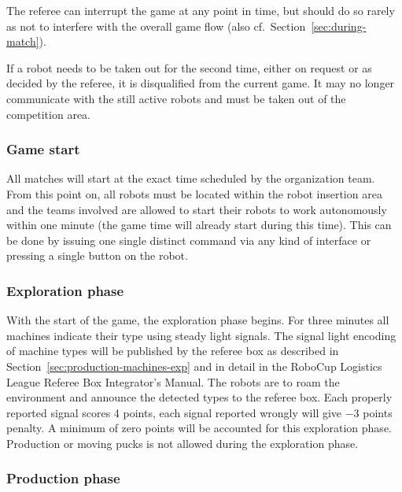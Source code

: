 \documentclass[12pt,twoside]{article}
\newcommand{\refsec}[1]{Section~\ref{#1}}
\begin{document}
The referee can interrupt the game at any point in time, but should do
so rarely as not to interfere with the overall game flow (also
cf.~\refsec{sec:during-match}).

If a robot needs to be taken out for the second time, either on
request or as decided by the referee, it is disqualified from the
current game. It may no longer communicate with the still active
robots and must be taken out of the competition area.

\subsubsection{Game start}
\label{sec:game-start}
%
All matches will start at the exact time scheduled by the organization
team. From this point on, all robots must be located within the robot
insertion area and the teams involved are allowed to start their
robots to work autonomously within one minute (the game time will
already start during this time). This can be done by issuing one
single distinct command via any kind of interface or pressing a single
button on the robot.

\subsubsection{Exploration phase}
\label{sec:expphase}
%
With the start of the game, the exploration phase begins. For three
minutes all machines indicate their type using steady light
signals. The signal light encoding of machine types will be published
by the referee box as described in
\refsec{sec:production-machines-exp} and in detail in the RoboCup
Logistics League Referee Box Integrator's Manual. The robots are to
roam the environment and announce the detected types to the referee
box.  Each properly reported signal scores \num{+4} points, each
signal reported wrongly will give \num{-3} points penalty. A minimum
of zero points will be accounted for this exploration
phase. Production or moving pucks is not allowed during the
exploration phase.


\subsubsection{Production phase}
\label{sec:production-phase}
\end{document}
